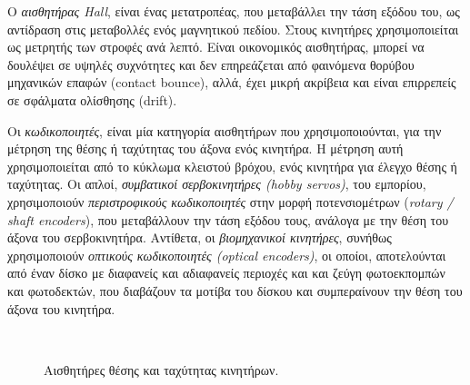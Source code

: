 \begin{enumerate}
Ο \textit{αισθητήρας Hall}, είναι ένας μετατροπέας, που μεταβάλλει την τάση εξόδου του, ως αντίδραση στις μεταβολλές ενός μαγνητικού πεδίου. Στους κινητήρες χρησιμοποιείται ως μετρητής των στροφές ανά λεπτό. Είναι οικονομικός αισθητήρας, μπορεί να δουλέψει σε υψηλές συχνότητες και δεν επηρεάζεται από φαινόμενα θορύβου μηχανικών επαφών (contact bounce), αλλά, έχει μικρή ακρίβεια και είναι επιρρεπείς σε σφάλματα ολίσθησης (drift).

Οι \textit{κωδικοποιητές}, είναι μία κατηγορία αισθητήρων που χρησιμοποιούνται, για την μέτρηση της θέσης ή ταχύτητας του άξονα ενός κινητήρα. Η μέτρηση αυτή χρησιμοποιείται από το κύκλωμα κλειστού βρόχου, ενός κινητήρα για έλεγχο θέσης ή ταχύτητας. Οι απλοί, \textit{συμβατικοί σερβοκινητήρες (hobby servos)}, του εμπορίου, χρησιμοποιούν \textit{περιστροφικούς κωδικοποιητές} στην μορφή ποτενσιομέτρων (\textit{rotary / shaft encoders}), που μεταβάλλουν την τάση εξόδου τους, ανάλογα με την θέση του άξονα του σερβοκινητήρα. Αντίθετα, οι \textit{βιομηχανικοί κινητήρες}, συνήθως χρησιμοποιούν \textit{οπτικούς κωδικοποιητές (optical encoders)}, οι οποίοι, αποτελούνται από έναν δίσκο με διαφανείς και αδιαφανείς περιοχές και και ζεύγη φωτοεκπομπών και φωτοδεκτών, που διαβάζουν τα μοτίβα του δίσκου και συμπεραίνουν την θέση του άξονα του κινητήρα.

\begin{figure}[!ht]
	\centering
	\\
	\caption{Αισθητήρες θέσης και ταχύτητας κινητήρων.}
\end{figure}



\end{enumerate}
